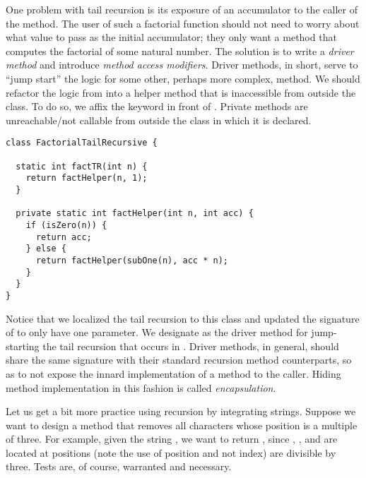 One problem with tail recursion is its exposure of an accumulator to the caller of the method. The user of such a factorial function should not need to worry about what value to pass as the initial accumulator; they only want a method that computes the factorial of some natural number. The solution is to write a \textit{driver method} and introduce \textit{method access modifiers}. Driver methods, in short, serve to ``jump start'' the logic for some other, perhaps more complex, method. We should refactor the logic from  into a helper method that is inaccessible from outside the class. To do so, we affix the  keyword in front of . Private methods are unreachable/not callable from outside the class in which it is declared.

\begin{cl}[]{}
\begin{lstlisting}[language=MyJava]
class FactorialTailRecursive {
  
  static int factTR(int n) {
    return factHelper(n, 1);
  }

  private static int factHelper(int n, int acc) {
    if (isZero(n)) {
      return acc;
    } else {
      return factHelper(subOne(n), acc * n);
    }
  }
}
\end{lstlisting}
\end{cl}

Notice that we localized the tail recursion to this class and updated the signature of  to only have one parameter. We designate  as the driver method for jump-starting the tail recursion that occurs in . Driver methods, in general, should share the same signature with their standard recursion method counterparts, so as to not expose the innard implementation of a method to the caller. Hiding method implementation in this fashion is called \textit{encapsulation}. 

\example Let us get a bit more practice using recursion by integrating strings. Suppose we want to design a method that removes all characters whose position is a multiple of three. For example, given the string , we want to return , since , , and  are located at positions (note the use of position and not index) are divisible by three. Tests are, of course, warranted and necessary.

